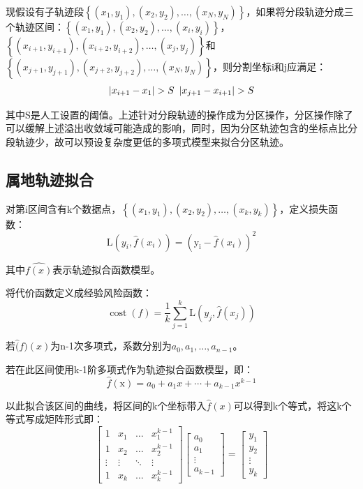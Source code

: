 现假设有子轨迹段$\left\{\left(x_{1}, y_{1}\right),\left(x_{2}, y_{2}\right), \dots,\left(x_{N}, y_{N}\right)\right\}$，如果将分段轨迹分成三个轨迹区间：$\left\{\left(x_{1}, y_{1}\right),\left(x_{2}, y_{2}\right), \dots,\left(x_{i}, y_{i}\right)\right\}$，$\left\{\left(x_{i+1}, y_{i+1}\right),\left(x_{i+2}, y_{i+2}\right), \ldots,\left(x_{j}, y_{j}\right)\right\}$和$\left\{\left(x_{j+1}, y_{j+1}\right),\left(x_{j+2}, y_{j+2}\right), \dots,\left(x_{N}, y_{N}\right)\right\}$，则分割坐标i和j应满足：
\[
\left|x_{i+1}-x_{1}\right|>S\\\
\left|x_{j+1}-x_{i+1}\right|>S
\]

其中S是人工设置的阈值。上述针对分段轨迹的操作成为分区操作，分区操作除了可以缓解上述溢出收敛域可能造成的影响，同时，因为分区轨迹包含的坐标点比分段轨迹少，故可以预设复杂度更低的多项式模型来拟合分区轨迹。

\subsection{属地轨迹拟合}
对第i区间含有k个数据点，$\left\{\left(x_{1}, y_{1}\right),\left(x_{2}, y_{2}\right), \ldots,\left(x_{k}, y_{k}\right)\right\}$，定义损失函数：
\[
\mathrm{L}\left(y_{i}, \hat{f}\left(x_{i}\right)\right)=\left(\mathrm{y_i}-\hat{f}\left(x_{i}\right)\right)^{2}
\]

其中$\hat{f(x)}$表示轨迹拟合函数模型。

将代价函数定义成经验风险函数：
\begin{equation}
\label{ch3costwithoutl1}
\operatorname{cost}(f)=\frac{1}{k} \sum_{j=1}^{k} \mathrm{L}\left(y_{j}, \hat{f}\left(x_{j}\right)\right)
\end{equation}

若$\hat(f)(x)$为n-1次多项式，系数分别为$a_0,a_1,…,a_{n-1}$。

若在此区间使用k-1阶多项式作为轨迹拟合函数模型，即：
\[
\hat{f}\left( \text{x} \right) =a_0+a_1x+\cdots +a_{k-1}x^{k-1}
\]

以此拟合该区间的曲线，将区间的k个坐标带入$\hat{f}(x)$可以得到k个等式，将这k个等式写成矩阵形式即：
\[
\left[\begin{array}{cccc}
{1} & {x_{1}} & {\dots} & {x_{1}^{k-1}} \\
{1} & {x_{2}} & {\dots} & {x_{2}^{k-1}} \\
{\vdots} & {\vdots} & {\ddots} & {\vdots} \\
{1} & {x_{k}} & {\dots} & {x_{k}^{k-1}}
\end{array}\right]\left[\begin{array}{c}
{a_{0}} \\
{a_{1}} \\
{\vdots} \\
{a_{k-1}}
\end{array}\right]=\left[\begin{array}{c}
{y_{1}} \\
{y_{2}} \\
{\vdots} \\
{y_{k}}
\end{array}\right]
\]


